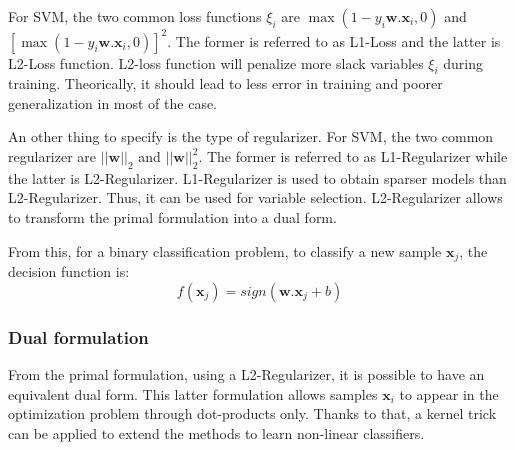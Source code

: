 For SVM, the two common loss functions $\xi_i$ are $\max(1-y_i \textbf{w}. \textbf{x}_i, 0)$ and $[\max(1-y_i \textbf{w}.\textbf{x}_i, 0)]^2$. The former is referred to as L1-Loss and the latter is L2-Loss function. L2-loss function will penalize more slack variables $\xi_i$ during training. Theorically, it should lead to less error in training and poorer generalization in most of the case.

An other thing to specify is the type of regularizer. For SVM, the two common regularizer are $||\textbf{w}||_2$ and $||\textbf{w}||_2^2$. The former is referred to as L1-Regularizer while the latter is L2-Regularizer. L1-Regularizer is used to obtain sparser models than L2-Regularizer. Thus, it can be used for variable selection. L2-Regularizer allows to transform the primal formulation into a dual form.

\noindent From this, for a binary classification problem, to classify a new sample $\textbf{x}_j$, the decision function is:
\begin{equation}
	f(\textbf{x}_j) = sign(\textbf{w}. \textbf{x}_j + b)
\end{equation}

\subsubsection{Dual formulation}
From the primal formulation, using a L2-Regularizer, it is possible to have an equivalent dual form. This latter formulation allows samples $\textbf{x}_i$ to appear in the optimization problem through dot-products only. Thanks to that, a kernel trick can be applied to extend the methods to learn non-linear classifiers.

